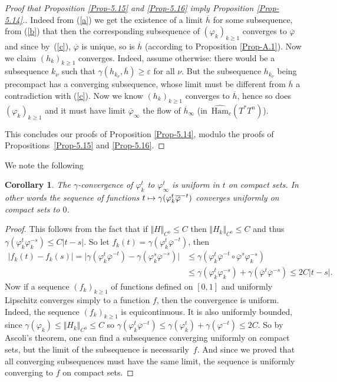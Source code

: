 \documentclass[JEP,XML,SOM,NoFloatCountersInSection,Unicode,published]{cedram}
\newcommand\mto{\mathchoice{\longmapsto}{\mapsto}{\mapsto}{\mapsto}}
\numberwithin{equation}{section}
\newcommand {\DHam}{\mathrm{Ham}}
\newcommand{\gclDHamc}[1]{\widehat{\DHam}_c(#1)}
\theoremstyle{plain}
\newtheorem{corollary}[theorem]{Corollary}
\theoremstyle{definition}
\theoremstyle{remark}
\begin{document}
\begin{proof} [ Proof that Proposition \ref{Prop-5.15} and \ref{Prop-5.16} imply
Proposition \ref{Prop-5.14}.]
Indeed from (\ref{a}) we get the existence of a limit $\overline h$ for some subsequence, from (\ref{b}) that then the corresponding subsequence of $(\varphi_k)_{k\geq 1}$ converges to $\overline\varphi$ and since by~(\ref{c}), $\overline \varphi$ is unique, so is $\overline h$ (according to Proposition \ref{Prop-A.1}).
Now we claim $(h_k)_{k\geq 1}$ converges. Indeed, assume otherwise: there would be a subsequence $k_\nu$ such that $\gamma (h_{k_\nu},\overline h) \geq \varepsilon $ for all $\nu$. But the subsequence $h_{k_\nu}$ being precompact has a converging subsequence, whose limit must be different from $\overline h$ a contradiction with (\ref{c}). Now we know $(h_k)_{k\geq 1}$ converges to $\overline h$, hence so does $(\varphi_k)_{k\geq 1}$ and it must have limit $\overline \varphi_\infty$ the flow of $\overline h_\infty$ (in~$\gclDHamc{T^*T^n}$).

This concludes our proofs of Proposition \ref{Prop-5.14}, modulo the proofs of Propositions~\ref{Prop-5.15}
and \ref{Prop-5.16}.
\end{proof}

\pagebreak[2]
We note the following

\begin{corollary} \label{Corollary-5.17}
The $\gamma$-convergence of $\varphi_k^t$ to $\varphi_\infty^t$ is uniform in $t$ on compact sets. In other words the sequence of functions $t \mto \gamma(\varphi_k^t\overline\varphi^{-t})$ converges uniformly on compact sets to $0$.
\end{corollary}
\begin{proof}
This follows from the fact that if $ \Vert H \Vert_{C^0} \leq C$ then $ \Vert H_k \Vert_{C^0} \leq C$ and thus $\gamma (\varphi_k^t\varphi_k^{-s}) \leq C \vert t-s \vert $.
So let $f_k(t)=\gamma (\varphi_k^t\overline\varphi^{-t})$, then
\begin{align*}
\vert f_k(t)-f_k(s) \vert =\vert \gamma(\varphi_k^t\overline\varphi^{-t}) - \gamma(\varphi_k^s\overline\varphi^{-s}) \vert &\leq \gamma (\varphi_k^t\overline\varphi^{-t}\circ \overline\varphi^{s}\varphi_k^{-s})\\
&\leq
\gamma (\varphi_k^t\varphi_k^{-s})+ \gamma (\overline \varphi^t\overline\varphi^{-s})\leq 2 C \vert t-s \vert.
\end{align*}
Now if a sequence $(f_k)_{k\geq 1}$ of functions defined on $[0,1]$ and uniformly Lipschitz converges simply to a function $f$, then the convergence is uniform. Indeed, the sequence $(f_k)_{k\geq 1}$ is equicontinuous. It is also uniformly bounded, since $\gamma(\varphi_k)\leq \Vert H_k\Vert_{C^0}\leq C$ so $\gamma (\varphi_k^t\overline\varphi^{-t}) \leq \gamma (\varphi_k^t)+\gamma(\varphi^{-t})\leq 2C$. So by Ascoli's theorem, one can find a subsequence converging uniformly on compact sets, but the limit of the subsequence is necessarily~$f$. And since we proved that all converging subsequences must have the same limit, the sequence is uniformly converging to $f$ on compact sets.
\end{proof}
\end{document}
